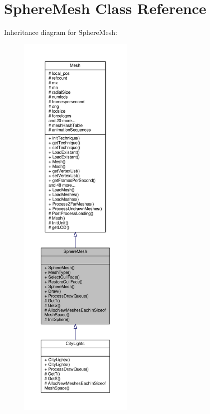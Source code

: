 \hypertarget{classSphereMesh}{}\section{Sphere\+Mesh Class Reference}
\label{classSphereMesh}


Inheritance diagram for Sphere\+Mesh\+:
\nopagebreak
\begin{figure}[H]
\begin{center}
\leavevmode
\includegraphics[height=550pt]{d6/d0e/classSphereMesh__inherit__graph}
\end{center}
\end{figure}


